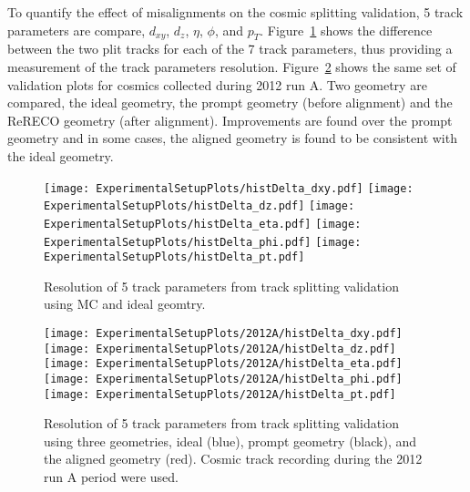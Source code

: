 
To quantify the effect of misalignments on the cosmic splitting 
validation, 5 track parameters are compare, $d_{xy}$, $d_z$,
$\eta$, $\phi$, and $p_T$. Figure~\ref{fig:trackSplittingMC}
shows the difference between the two plit tracks for each of the
7 track parameters, thus providing a measurement of the track
parameters resolution.  Figure~\ref{fig:trackSplitting2012A} shows
the same set of validation plots for cosmics collected during
2012 run A.  Two geometry are compared, the ideal geometry, the 
prompt geometry (before alignment) and the ReRECO geometry (after 
alignment).  Improvements are found over the prompt geometry and
in some cases, the aligned geometry is found to be consistent 
with the ideal geometry.  

\begin{figure}
\begin{center}
\texttt{[image: ExperimentalSetupPlots/histDelta\_dxy.pdf]}
\texttt{[image: ExperimentalSetupPlots/histDelta\_dz.pdf]}
\texttt{[image: ExperimentalSetupPlots/histDelta\_eta.pdf]}
\texttt{[image: ExperimentalSetupPlots/histDelta\_phi.pdf]}
\texttt{[image: ExperimentalSetupPlots/histDelta\_pt.pdf]}
\label{fig:trackSplittingMC}
\caption{Resolution of 5 track parameters from track splitting validation 
using MC and ideal geomtry. }
\end{center}
\end{figure}

\begin{figure}
\begin{center}
\texttt{[image: ExperimentalSetupPlots/2012A/histDelta\_dxy.pdf]}
\texttt{[image: ExperimentalSetupPlots/2012A/histDelta\_dz.pdf]}
\texttt{[image: ExperimentalSetupPlots/2012A/histDelta\_eta.pdf]}
\texttt{[image: ExperimentalSetupPlots/2012A/histDelta\_phi.pdf]}
\texttt{[image: ExperimentalSetupPlots/2012A/histDelta\_pt.pdf]}
\label{fig:trackSplitting2012A}
\caption{Resolution of 5 track parameters from track splitting validation 
using three geometries, ideal (blue), prompt geometry (black), and the
aligned geometry (red).  Cosmic track recording during the 2012 run A
period were used.}
\end{center}
\end{figure}

